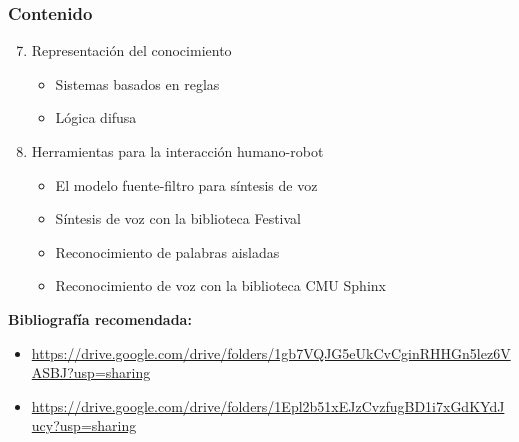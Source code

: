 \begin{frame}\frametitle{Contenido}
  \begin{enumerate}
    \setcounter{enumi}{6}
  \item Representación del conocimiento
    \begin{itemize}
    \item Sistemas basados en reglas
    \item Lógica difusa
    \end{itemize}
  \item Herramientas para la interacción humano-robot
    \begin{itemize}
    \item El modelo fuente-filtro para síntesis de voz
    \item Síntesis de voz con la biblioteca Festival
    \item Reconocimiento de palabras aisladas
    \item Reconocimiento de voz con la biblioteca CMU Sphinx
    \end{itemize}
  \end{enumerate}
  \textbf{Bibliografía recomendada:}
  \begin{itemize}
    \item \url{https://drive.google.com/drive/folders/1gb7VQJG5eUkCvCginRHHGn5lez6VASBJ?usp=sharing}
    \item \url{https://drive.google.com/drive/folders/1Epl2b51xEJzCvzfugBD1i7xGdKYdJucy?usp=sharing}
  \end{itemize}
  
\end{frame}

